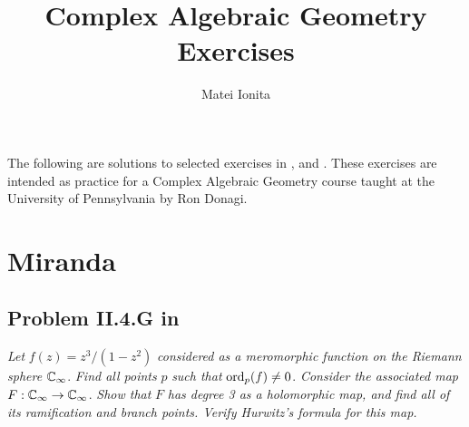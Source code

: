 \documentclass{article}
\begin{document}
\title{Complex Algebraic Geometry Exercises}
\author{Matei Ionita}

\maketitle

The following are solutions to selected exercises in \cite{Huy}, \cite{Mir} and \cite{Voi1}. These exercises are
intended as practice for a Complex Algebraic Geometry course taught at the University of Pennsylvania
by Ron Donagi.

\section{Miranda}
\subsection*{Problem II.4.G in \cite{Mir}}
\textit{Let} $f(z) = z^3/(1-z^2)$ \textit{considered as a meromorphic function on the Riemann sphere}
$\mathbb{C}_{\infty}$. \textit{Find all points} $p$ \textit{such that} $\operatorname{ord}_p(f) \neq 0$. \textit{Consider the
associated map} $F: \mathbb{C}_{\infty} \to \mathbb{C}_{\infty}$. \textit{Show that} $F$ \textit{has degree 3 as a
holomorphic map, and find all of its ramification and branch points. Verify Hurwitz's formula for this map.}
\end{document}
